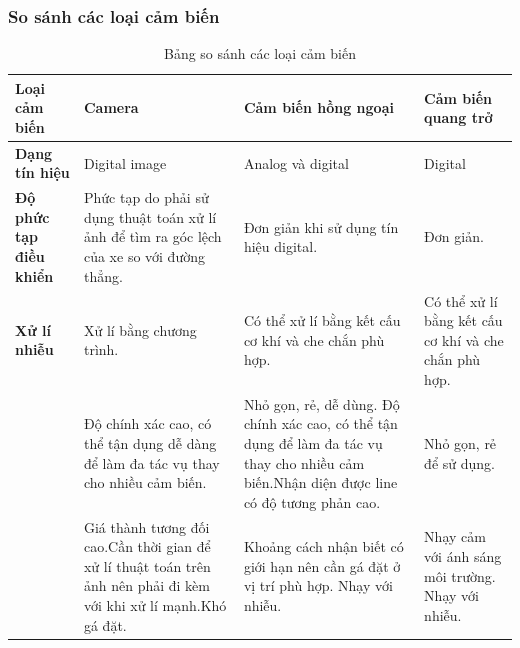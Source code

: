             \subsubsection{So sánh các loại cảm biến}
                \begin{table}[H]
                    \centering
                    \caption{Bảng so sánh các loại cảm biến}
                    \begin{tabular}{|>{\raggedright\arraybackslash}p{2.5cm}|>{\raggedright\arraybackslash}p{3cm}|>{\raggedright\arraybackslash}p{4cm}|>{\raggedright\arraybackslash}p{3cm}|}
                    \hline
                    \textbf{Loại cảm biến} & \textbf{Camera} & \textbf{Cảm biến hồng ngoại} & \textbf{Cảm biến quang trở} \\
                    \hline
                    \textbf{Dạng tín hiệu} & Digital image & Analog và digital & Digital \\
                    \hline
                    \textbf{Độ phức tạp điều khiển} & Phức tạp do phải sử dụng thuật toán xử lí ảnh để tìm ra góc lệch của xe so với đường thẳng. & Đơn giản khi sử dụng tín hiệu digital. & Đơn giản. \\
                    \hline
                    \textbf{Xử lí nhiễu} & Xử lí bằng chương trình. & Có thể xử lí bằng kết cấu cơ khí và che chắn phù hợp. & Có thể xử lí bằng kết cấu cơ khí và che chắn phù hợp. \\
                    \hline
                    \multirow{3}{*}{\textbf{Ưu điểm}} & Độ chính xác cao, có thể tận dụng dễ dàng để làm đa tác vụ thay cho nhiều cảm biến. & Nhỏ gọn, rẻ, dễ dùng. Độ chính xác cao, có thể tận dụng để làm đa tác vụ thay cho nhiều cảm biến.\newline Nhận diện được line có độ tương phản cao. & Nhỏ gọn, rẻ để sử dụng. \\
                    \hline
                    \multirow{3}{*}{\textbf{Nhược điểm}} & Giá thành tương đối cao.\newline Cần thời gian để xử lí thuật toán trên ảnh nên phải đi kèm với khi xử lí mạnh.\newline Khó gá đặt. & Khoảng cách nhận biết có giới hạn nên cần gá đặt ở vị trí phù hợp. \newline Nhạy với nhiễu. & Nhạy cảm với ánh sáng môi trường. \newline Nhạy với nhiễu. \\
                    \hline
                    \end{tabular}
                \end{table}
